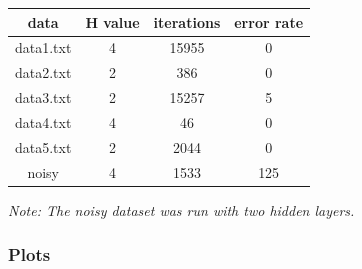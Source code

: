 \documentclass{article}
\begin{document}
\begin{center}
\begin{tabular}{|c|c|c|c|}
\hline
\textbf{data} & \textbf{H value} & \textbf{iterations} & \textbf{error rate} \\
\hline
data1.txt & 4 & 15955 & 0 \\
data2.txt & 2 & 386 & 0 \\
data3.txt & 2 & 15257 & 5 \\
data4.txt & 4 & 46 & 0 \\
data5.txt & 2 & 2044 & 0 \\
noisy     & 4 & 1533 & 125 \\
\hline
\end{tabular}
\end{center}

\textit{Note: The noisy dataset was run with two hidden layers.}\\

\newpage
\subsubsection*{Plots}
\end{document}
